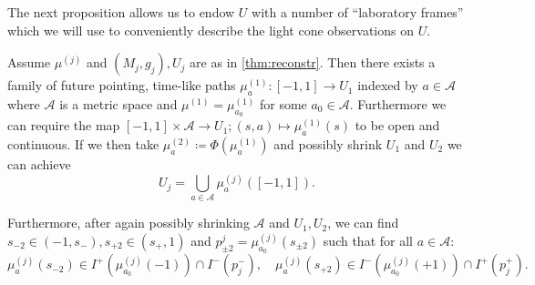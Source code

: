 The next proposition allows us to endow $U$ with a number of \enquote{laboratory frames} which we will use to conveniently describe the light cone observations on $U$.
\begin{proposition}
Assume $\mu^{(j)}$ and $(M_j,g_j), U_j$ are as in \ref{thm:reconstr}. 
Then there exists a family of future pointing, time-like paths $\mu_a^{(1)}:[-1,1]\to U_1$ indexed by $a\in \mathcal{A}$ where $\mathcal{A}$ is a metric space and $\mu^{(1)}=\mu_{a_0}^{(1)}$ for some $a_0\in\mathcal{A}$. Furthermore we can require the map $[-1,1]\times\mathcal{A}\to U_1; (s,a)\mapsto \mu^{(1)}_a(s)$ to be open and continuous. If we then take $\mu^{(2)}_a\coloneqq\Phi(\mu^{(1)}_a)$ and possibly shrink $U_1$ and $U_2$ we can achieve
\begin{equation}\label{eq:frameunion}
U_j = \bigcup_{a\in \mathcal{A}}\mu^{(j)}_a([-1,1]).
\end{equation}

Furthermore, after again possibly shrinking $\mathcal{A}$ and $U_1,U_2$, we can find $s_{-2}\in (-1,s_-), s_{+2}\in (s_+,1)$ and $p^j_{\pm 2}=\mu^{(j)}_{a_0}(s_{\pm2})$ such that for all $a\in \mathcal{A}$:
\begin{equation}\label{eq:framerestriction}
    \mu^{(j)}_a(s_{-2})\in I^+(\mu^{(j)}_{a_0}(-1))\cap I^-(p^-_j), \quad
\mu^{(j)}_a(s_{+2})\in I^-(\mu^{(j)}_{a_0}(+1))\cap I^+(p^+_j).
\end{equation}
\end{proposition}
